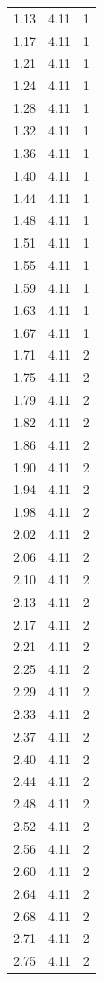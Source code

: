 \begin{longtable}{lrr}
  1.13 & 4.11 & 1 \\
  1.17 & 4.11 & 1 \\
  1.21 & 4.11 & 1 \\
  1.24 & 4.11 & 1 \\
  1.28 & 4.11 & 1 \\
  1.32 & 4.11 & 1 \\
  1.36 & 4.11 & 1 \\
  1.40 & 4.11 & 1 \\
  1.44 & 4.11 & 1 \\
  1.48 & 4.11 & 1 \\
  1.51 & 4.11 & 1 \\
  1.55 & 4.11 & 1 \\
  1.59 & 4.11 & 1 \\
  1.63 & 4.11 & 1 \\
  1.67 & 4.11 & 1 \\
  1.71 & 4.11 & 2 \\
  1.75 & 4.11 & 2 \\
  1.79 & 4.11 & 2 \\
  1.82 & 4.11 & 2 \\
  1.86 & 4.11 & 2 \\
  1.90 & 4.11 & 2 \\
  1.94 & 4.11 & 2 \\
  1.98 & 4.11 & 2 \\
  2.02 & 4.11 & 2 \\
  2.06 & 4.11 & 2 \\
  2.10 & 4.11 & 2 \\
  2.13 & 4.11 & 2 \\
  2.17 & 4.11 & 2 \\
  2.21 & 4.11 & 2 \\
  2.25 & 4.11 & 2 \\
  2.29 & 4.11 & 2 \\
  2.33 & 4.11 & 2 \\
  2.37 & 4.11 & 2 \\
  2.40 & 4.11 & 2 \\
  2.44 & 4.11 & 2 \\
  2.48 & 4.11 & 2 \\
  2.52 & 4.11 & 2 \\
  2.56 & 4.11 & 2 \\
  2.60 & 4.11 & 2 \\
  2.64 & 4.11 & 2 \\
  2.68 & 4.11 & 2 \\
  2.71 & 4.11 & 2 \\
  2.75 & 4.11 & 2 \\

\end{longtable}
